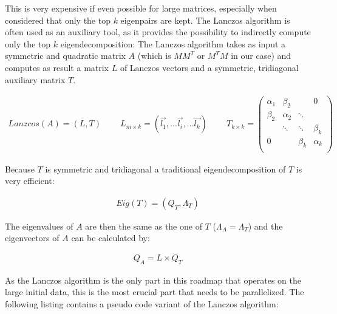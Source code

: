This is very expensive if even possible for large matrices, especially when considered that only the top $k$ eigenpairs are kept. The Lanczos algorithm is often used as an auxiliary tool, as it provides the possibility to indirectly compute only the top $k$ eigendecomposition: The Lanczos algorithm takes as input a symmetric and quadratic matrix $A$ (which is $MM^T$ or $M^T M$ in our case) and computes as result a matrix $L$ of Lanczos vectors and a symmetric, tridiagonal auxiliary matrix $T$.

\begin{align*}
	Lanzcos(A) = (L,T) \;\;\;\;\;\;\;\;
	L_{m\times k} = \left ( \vec{l_1}, ... \vec{l_i}, ... \vec{l_k} \right ) \;\;\;\;\;\;\;\;
	T_{k\times k} = \begin{pmatrix}  
\alpha_1 & \beta_2  &          & 0 \\
\beta_2  & \alpha_2 & \ddots   & \\
         & \ddots   & \ddots   & \beta_k \\
0        &          & \beta_k  & \alpha_k \\
\end{pmatrix}
\end{align*}

Because $T$ is symmetric and tridiagonal a traditional eigendecomposition of $T$ is very efficient:

\begin{align*}
	Eig(T) = (Q_T,\Lambda_T)
\end{align*}

The eigenvalues of $A$ are then the same as the one of $T$ ($\Lambda_A = \Lambda_T$) and the eigenvectors of $A$ can be calculated by:

\begin{align*}
	Q_A = L \times Q_T
\end{align*}

As the Lanczos algorithm is the only part in this roadmap that operates on the large initial data, this is the most crucial part that needs to be parallelized. The following listing contains a pseudo code variant of the Lanczos algorithm:

